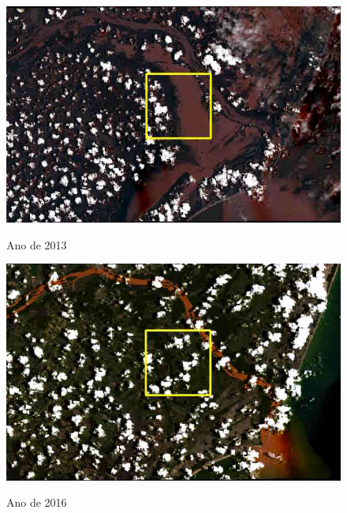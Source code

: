 			\begin{minipage}[t!]{0.33\textwidth}
				\begin{figure}[H]
					\centering \small \caption{Ano de 2013}
					\includegraphics[width=0.97\linewidth]{FIGURAS/enche}
					\label{fig:indao} 
				\end{figure}			
			\end{minipage}\hfill
			\begin{minipage}[t!]{0.33\textwidth}
				\begin{figure}[H]
					\centering \small \caption{Ano de 2016}
					\includegraphics[width=0.97\linewidth]{FIGURAS/lamache1}
					\label{fig:indao2} 
				\end{figure}					
			\end{minipage} 
